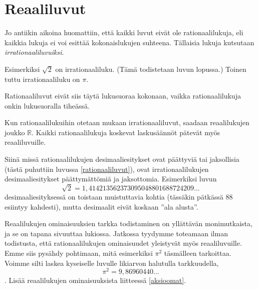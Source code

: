 \chapter{Reaaliluvut}

Jo antiikin aikoina huomattiin, että kaikki luvut eivät ole rationaalilukuja, eli kaikkia lukuja ei voi esittää kokonaislukujen suhteena. Tällaisia lukuja kutsutaan \emph{irrationaaliluvuiksi}.

Esimerkiksi $\sqrt{2}$ on irrationaaliluku. (Tämä todistetaan
luvun lopussa.) Toinen tuttu irrationaaliluku on $\pi$.

Rationaaliluvut eivät siis täytä lukusuoraa kokonaan, vaikka
rationaalilukuja onkin lukusuoralla tiheässä.


Kun rationaalilukuihin otetaan mukaan irrationaaliluvut, saadaan reaalilukujen joukko $\mathbb{R}$. Kaikki rationaalilukuja koskevat
laskusäännöt pätevät myös reaaliluvuille.

Siinä missä rationaalilukujen desimaaliesitykset ovat päättyviä tai jaksollisia (tästä puhuttiin luvussa \ref{rationaaliluvut}), ovat
irrationaalilukujen desimaaliesitykset päättymättömiä ja
jaksottomia. Esimerkiksi luvun
\[\sqrt{2} = 1,414213562373095048801688724209\ldots\]
desimaaliesityksessä on toistaan muistuttavia kohtia
(tässäkin pätkässä 88 esiintyy kahdesti), mutta desimaalit eivät koskaan ''ala alusta''.

Reaalilukujen ominaisuuksien tarkka todistaminen on yllättävän
monimutkaista, ja se on tapana sivuuttaa lukiossa. Jatkossa
tyydymme toteamaan ilman todistusta, että rationaalilukujen
ominaisuudet yleistyvät myös reaaliluvuille.
Emme siis pysähdy pohtimaan, mitä esimerkiksi
$\pi^2$ täsmälleen tarkoittaa.
Voimme silti laskea kyseiselle luvulle likiarvon
halutulla tarkkuudella,
\[ \pi^2 =9,86960440\ldots \].
Lisää reaalilukujen ominaisuuksista liitteessä \ref{aksioomat}.

